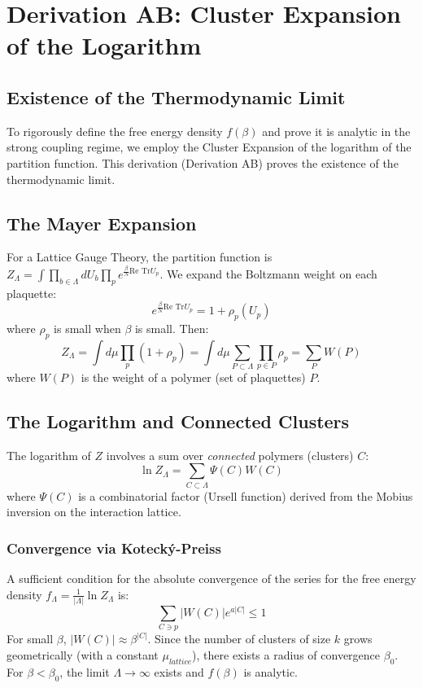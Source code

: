 \chapter{Derivation AB: Cluster Expansion of the Logarithm}
\label{ch:derivation_ab_cluster_expansion}

\section{Existence of the Thermodynamic Limit}
\label{subsec:infinite_volume}

To rigorously define the free energy density $f(\beta)$ and prove it is analytic in the strong coupling regime, we employ the Cluster Expansion of the logarithm of the partition function. This derivation (Derivation AB) proves the existence of the thermodynamic limit.

\section{The Mayer Expansion}

For a Lattice Gauge Theory, the partition function is $Z_\Lambda = \int \prod_{b \in \Lambda} dU_b \prod_{p} e^{\frac{\beta}{N} \text{Re Tr} U_p}$.
We expand the Boltzmann weight on each plaquette:
\begin{equation}
e^{\frac{\beta}{N} \text{Re Tr} U_p} = 1 + \rho_p(U_p)
\end{equation}
where $\rho_p$ is small when $\beta$ is small.
Then:
\begin{equation}
Z_\Lambda = \int d\mu \prod_p (1 + \rho_p) = \int d\mu \sum_{P \subset \Lambda} \prod_{p \in P} \rho_p = \sum_{P} W(P)
\end{equation}
where $W(P)$ is the weight of a polymer (set of plaquettes) $P$.

\section{The Logarithm and Connected Clusters}

The logarithm of $Z$ involves a sum over \textit{connected} polymers (clusters) $C$:
\begin{equation}
\ln Z_\Lambda = \sum_{C \subset \Lambda} \Psi(C) W(C)
\end{equation}
where $\Psi(C)$ is a combinatorial factor (Ursell function) derived from the Mobius inversion on the interaction lattice.

\subsection{Convergence via Kotecký-Preiss}
A sufficient condition for the absolute convergence of the series for the free energy density $f_\Lambda = \frac{1}{|\Lambda|} \ln Z_\Lambda$ is:
\begin{equation}
\sum_{C \ni p} |W(C)| e^{a |C|} \le 1
\end{equation}
For small $\beta$, $|W(C)| \approx \beta^{|C|}$. Since the number of clusters of size $k$ grows geometrically (with a constant $\mu_{lattice}$), there exists a radius of convergence $\beta_0$.
For $\beta < \beta_0$, the limit $\Lambda \to \infty$ exists and $f(\beta)$ is analytic.

